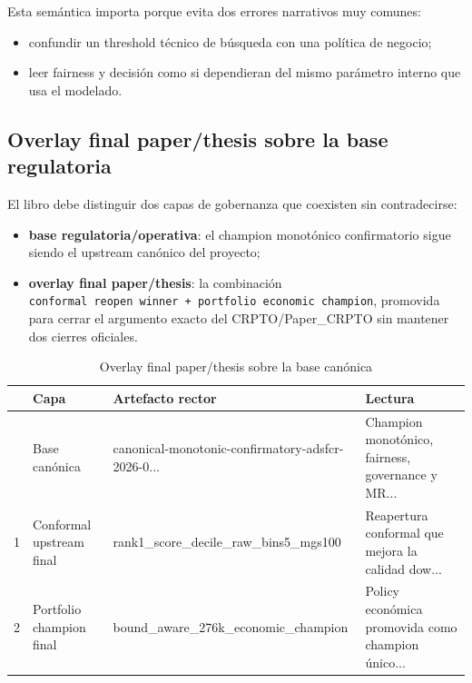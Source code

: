 \documentclass[
  spanish,
  11pt,
  letterpaper,
]{scrbook}
\providecommand{\tightlist}{%
  \setlength{\itemsep}{0pt}\setlength{\parskip}{0pt}}
\theoremstyle{plain}
\theoremstyle{remark}
\begin{document}
Esta semántica importa porque evita dos errores narrativos muy comunes:

\begin{itemize}
\tightlist
\item
  confundir un threshold técnico de búsqueda con una política de
  negocio;
\item
  leer fairness y decisión como si dependieran del mismo parámetro
  interno que usa el modelado.
\end{itemize}

\subsection{Overlay final paper/thesis sobre la base
regulatoria}\label{overlay-final-paperthesis-sobre-la-base-regulatoria}

El libro debe distinguir dos capas de gobernanza que coexisten sin
contradecirse:

\begin{itemize}
\tightlist
\item
  \textbf{base regulatoria/operativa}: el champion monotónico
  confirmatorio sigue siendo el upstream canónico del proyecto;
\item
  \textbf{overlay final paper/thesis}: la combinación
  \texttt{conformal\ reopen\ winner\ +\ portfolio\ economic\ champion},
  promovida para cerrar el argumento exacto del CRPTO/Paper\_CRPTO sin
  mantener dos cierres oficiales.
\end{itemize}

{

\begin{longtable}[]{@{}llll@{}}

\caption{\label{tbl-mrm-final-overlay}Overlay final paper/thesis sobre
la base canónica}

\tabularnewline

\toprule\noalign{}
& Capa & Artefacto rector & Lectura \\
\midrule\noalign{}
\endhead
\bottomrule\noalign{}
\endlastfoot
0 & Base canónica & canonical-monotonic-confirmatory-adsfcr-2026-0... &
Champion monotónico, fairness, governance y MR... \\
1 & Conformal upstream final & rank1\_score\_decile\_raw\_bins5\_mgs100
& Reapertura conformal que mejora la calidad dow... \\
2 & Portfolio champion final & bound\_aware\_276k\_economic\_champion &
Policy económica promovida como champion único... \\

\end{longtable}

}
\end{document}
